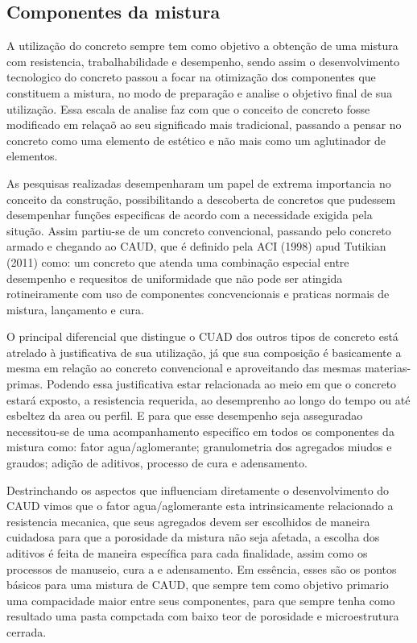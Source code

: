 \subsection{Componentes da mistura}
A utilização do concreto sempre tem como objetivo a obtenção de uma mistura com resistencia, trabalhabilidade e desempenho, sendo assim o desenvolvimento tecnologico do concreto passou a focar na otimização dos componentes que constituem a mistura, no modo de preparação e analise o objetivo final de sua utilização. Essa escala de analise faz com que o conceito de concreto fosse modificado em relaçaõ ao seu significado mais tradicional, passando a pensar no concreto como uma elemento de estético e não mais como um aglutinador de elementos.

As pesquisas realizadas desempenharam um papel de extrema importancia no conceito da construção, possibilitando a descoberta de concretos que pudessem desempenhar funções especificas de acordo com a necessidade exigida pela situção. Assim partiu-se de um concreto convencional, passando pelo concreto armado e chegando ao CAUD, que é definido pela ACI (1998) apud Tutikian (2011) como: um concreto que atenda uma combinação especial entre desempenho e requesitos de uniformidade que não pode ser atingida rotineiramente com uso de componentes concvencionais e praticas normais de mistura, lançamento e cura.

O principal diferencial que distingue o CUAD dos outros tipos de concreto está atrelado à justificativa de sua utilização, já que sua composição é basicamente a mesma em relação ao concreto convencional e aproveitando das mesmas materias-primas. Podendo essa justificativa estar relacionada ao meio em que o concreto estará exposto, a resistencia requerida, ao desemprenho ao longo do tempo ou até esbeltez da area ou perfil. E para que esse desempenho seja asseguradao necessitou-se de uma acompanhamento especifíco em todos os componentes da mistura como: fator agua/aglomerante; granulometria dos agregados miudos e graudos; adição de aditivos, processo de cura e adensamento.

Destrinchando os aspectos que influenciam diretamente o desenvolvimento do CAUD vimos que o fator agua/aglomerante esta intrinsicamente relacionado a resistencia mecanica, que seus agregados devem ser escolhidos de maneira cuidadosa para que a porosidade da mistura não seja afetada, a escolha dos aditivos é feita de maneira específica para cada finalidade, assim como os processos de manuseio, cura a e adensamento. Em essência, esses são os pontos básicos para uma mistura de CAUD, que sempre tem como objetivo primario uma compacidade maior entre seus componentes, para que sempre tenha como resultado uma pasta compctada com baixo teor de porosidade e microestrutura cerrada.

